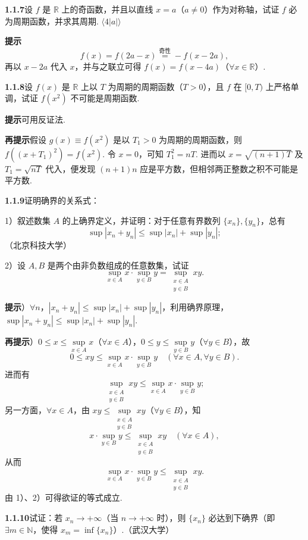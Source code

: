 \documentclass[UTF8,12pt,a4paper,fontset=fandol]{ctexart}
\begin{document}
\noindent\textbf{1.1.7}\quad 设 $f$ 是 $\mathbb{R}$ 上的奇函数，并且以直线 $x=a$（$a\ne0$）作为对称轴，试证 $f$ 必为周期函数，并求其周期. \hfill $\langle4|a|\rangle$

\noindent\textbf{提示}\quad
\[
  f(x)=f(2a-x)\overset{\text{奇性}}{=}-f(x-2a),
\]
再以 $x-2a$ 代入 $x$，并与之联立可得 $f(x)=f(x-4a)$（$\forall x\in\mathbb{R}$）.

\noindent\textbf{1.1.8}\quad 设 $f(x)$ 是 $\mathbb{R}$ 上以 $T$ 为周期的周期函数（$T>0$），且 $f$ 在 $[0,T)$ 上严格单调，试证 $f(x^2)$ 不可能是周期函数.

\noindent\textbf{提示}\quad 可用反证法.

\noindent\textbf{再提示}\quad 假设 $g(x)\equiv f(x^2)$ 是以 $T_1>0$ 为周期的周期函数，则 $f((x+T_1)^2)=f(x^2)$. 令 $x=0$，可知 $T_1^2=nT$. 进而以 $x=\sqrt{(n+1)T}$ 及 $T_1=\sqrt{nT}$ 代入，便发现 $(n+1)n$ 应是平方数，但相邻两正整数之积不可能是平方数.

\noindent\textbf{1.1.9}\quad 证明确界的关系式：

1）叙述数集 $A$ 的上确界定义，并证明：对于任意有界数列 $\{x_n\},\{y_n\}$，总有
\[
  \sup|x_n+y_n|\le \sup|x_n|+\sup|y_n|;
\]
（北京科技大学）

2）设 $A,B$ 是两个由非负数组成的任意数集，试证
\[
  \sup_{x\in A}x\cdot \sup_{y\in B}y=\sup_{\substack{x\in A\\y\in B}}xy.
\]

\noindent\textbf{提示}）$\forall n$，$|x_n+y_n|\le \sup|x_n|+\sup|y_n|$，利用确界原理，$\sup|x_n+y_n|\le \sup|x_n|+\sup|y_n|$.

\noindent\textbf{再提示}）$0\le x\le \sup\limits_{x\in A}x$（$\forall x\in A$），$0\le y\le \sup\limits_{y\in B}y$（$\forall y\in B$），故
\[
  0\le xy\le \sup_{x\in A}x\cdot\sup_{y\in B}y\quad(\forall x\in A,\forall y\in B).
\]
进而有
\[
  \sup_{\substack{x\in A\\y\in B}}xy\le \sup_{x\in A}x\cdot\sup_{y\in B}y;
\tag{1}
\]
另一方面，$\forall x\in A$，由 $xy\le \sup\limits_{\substack{x\in A\\y\in B}}xy$（$\forall y\in B$），知
\[
  x\cdot\sup_{y\in B}y\le \sup_{\substack{x\in A\\y\in B}}xy\quad(\forall x\in A),
\]
从而
\[
  \sup_{x\in A}x\cdot\sup_{y\in B}y\le \sup_{\substack{x\in A\\y\in B}}xy.
\tag{2}
\]
由 1）、2）可得欲证的等式成立.

\noindent\textbf{1.1.10}\quad 试证：若 $x_n\to+\infty$（当 $n\to+\infty$ 时），则 $\{x_n\}$ 必达到下确界（即 $\exists m\in\mathbb{N}$，使得 $x_m=\inf\{x_n\}$）.（武汉大学）
\end{document}

